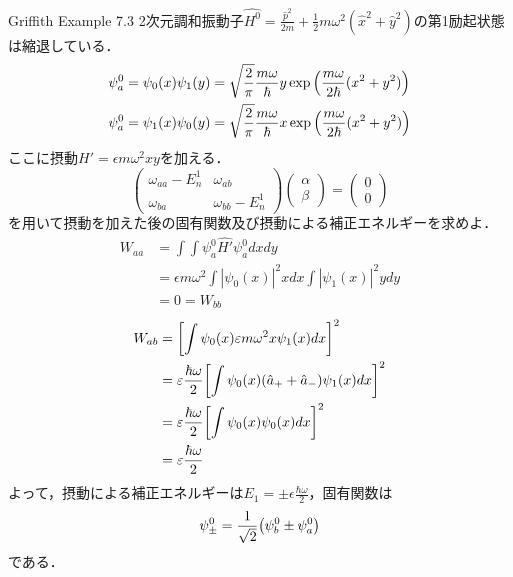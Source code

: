 \documentclass{report}
\begin{document}
  \begin{myexc}{Griffith Example 7.3}{}
    2次元調和振動子$\hat{H^0}=\frac{\hat{p}^2}{2m}+\frac{1}{2}m\omega^2(\hat{x}^2+\hat{y}^2)$の第1励起状態は縮退している．
    \begin{align}
      \psi^0_a&=\psi_0(x)\psi_1(y)=\sqrt{\frac{2}{\pi}}\frac{m\omega}{\hbar}y\exp\qty(\frac{m\omega}{2\hbar}(x^2+y^2))\\
      \psi^0_a&=\psi_1(x)\psi_0(y)=\sqrt{\frac{2}{\pi}}\frac{m\omega}{\hbar}x\exp\qty(\frac{m\omega}{2\hbar}(x^2+y^2))
    \end{align}
    ここに摂動$\hat{H'}=\epsilon m\omega^2xy$を加える．
    \begin{equation}
      \begin{pmatrix}
        \omega_{aa}-E_n^1&\omega_{ab}\\
        \omega_{ba}&\omega_{bb}-E_n^1
      \end{pmatrix}
      \begin{pmatrix}
        \alpha\\
        \beta
      \end{pmatrix}
      =
      \begin{pmatrix}
        0\\0
      \end{pmatrix}
    \end{equation}
    を用いて摂動を加えた後の固有関数及び摂動による補正エネルギーを求めよ．
    \tcblower
    \begin{align}
      W_{aa}&=\int\int\psi_a^0\hat{H'}\psi_a^0dxdy\\
      &=\epsilon m\omega^2\int|\psi_0(x)|^2xdx\int|\psi_1(x)|^2ydy\\
      &=0=W_{bb}
    \end{align}
    \begin{align}
      W_{ab}&=\qty[\int\psi_0(x)\varepsilon m\omega^2x\psi_1(x)dx]^2\\
      &=\varepsilon\frac{\hbar\omega}{2}\qty[\int\psi_0(x)(\hat{a}_{+}+\hat{a}_{-})\psi_1(x)dx]^2\\
      &=\varepsilon\frac{\hbar\omega}{2}\qty[\int\psi_0(x)\psi_0(x)dx]^2\\
      &=\varepsilon\frac{\hbar\omega}{2}
    \end{align}
    よって，摂動による補正エネルギーは$E_1=\pm\epsilon\frac{\hbar\omega}{2}$，固有関数は
    \begin{equation}
      \psi_{\pm}^0=\frac{1}{\sqrt{2}}\qty(\psi_b^0\pm\psi_a^0)
    \end{equation}
    である．
  \end{myexc}
\end{document}
